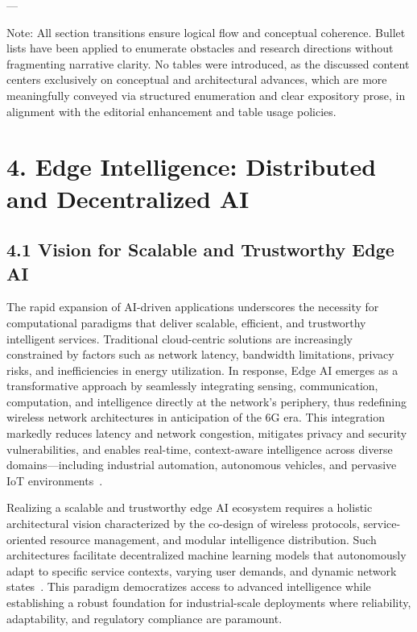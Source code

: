 \documentclass[11pt]{article}
\begin{document}
---

Note: All section transitions ensure logical flow and conceptual coherence. Bullet lists have been applied to enumerate obstacles and research directions without fragmenting narrative clarity. No tables were introduced, as the discussed content centers exclusively on conceptual and architectural advances, which are more meaningfully conveyed via structured enumeration and clear expository prose, in alignment with the editorial enhancement and table usage policies.

\section{4. Edge Intelligence: Distributed and Decentralized AI}

\subsection{4.1 Vision for Scalable and Trustworthy Edge AI}

The rapid expansion of AI-driven applications underscores the necessity for computational paradigms that deliver scalable, efficient, and trustworthy intelligent services. Traditional cloud-centric solutions are increasingly constrained by factors such as network latency, bandwidth limitations, privacy risks, and inefficiencies in energy utilization. In response, Edge AI emerges as a transformative approach by seamlessly integrating sensing, communication, computation, and intelligence directly at the network's periphery, thus redefining wireless network architectures in anticipation of the 6G era. This integration markedly reduces latency and network congestion, mitigates privacy and security vulnerabilities, and enables real-time, context-aware intelligence across diverse domains—including industrial automation, autonomous vehicles, and pervasive IoT environments~\cite{ref49}. 

Realizing a scalable and trustworthy edge AI ecosystem requires a holistic architectural vision characterized by the co-design of wireless protocols, service-oriented resource management, and modular intelligence distribution. Such architectures facilitate decentralized machine learning models that autonomously adapt to specific service contexts, varying user demands, and dynamic network states~\cite{ref49}. This paradigm democratizes access to advanced intelligence while establishing a robust foundation for industrial-scale deployments where reliability, adaptability, and regulatory compliance are paramount.
\end{document}
